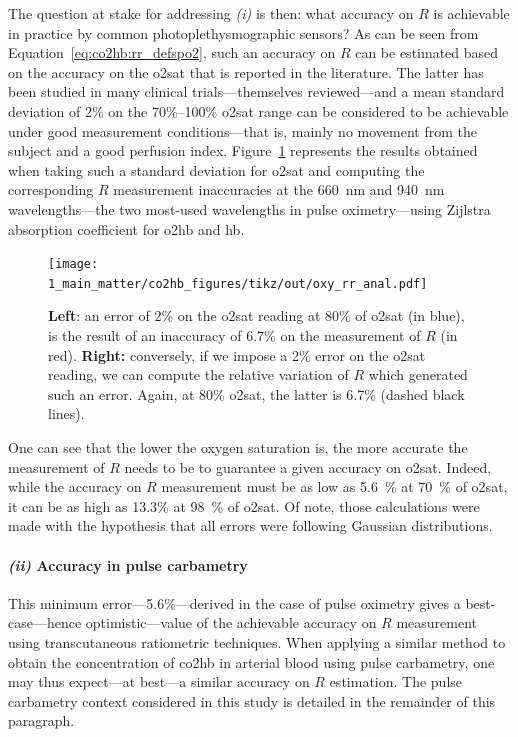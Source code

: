 The question at stake for addressing \textit{(i)} is then: what accuracy on $R$ is achievable in practice by common photoplethysmographic sensors? As can be seen from Equation~\ref{eq:co2hb:rr_defspo2}, such an accuracy on $R$ can be estimated based on the accuracy on the \gls{o2sat} that is reported in the literature. The latter has been studied in many clinical trials---themselves reviewed\cite{nitzan2014, jubran2015}---and a mean standard deviation of 2\% on the 70\%--100\% \gls{o2sat} range can be considered to be achievable under good measurement conditions---that is, mainly no movement from the subject and a good perfusion index. Figure~\ref{fig:oxy_acc} represents the results obtained when taking such a standard deviation for \gls{o2sat} and computing the corresponding $R$ measurement inaccuracies at the 660~nm and 940~nm wavelengths---the two most-used wavelengths in pulse oximetry---using Zijlstra \etal{}\cite{zijlstra2000} absorption coefficient for \gls{o2hb} and \gls{hb}.

\begin{figure}
	\centering
	\texttt{[image: 1\_main\_matter/co2hb\_figures/tikz/out/oxy\_rr\_anal.pdf]}
	\caption[Pulse oximetry ratio of ratios error]{\textbf{Left}: an error of 2\% on the \gls{o2sat} reading at 80\% of \gls{o2sat} (in blue), is the result of an inaccuracy of 6.7\% on the measurement of $R$ (in red). \textbf{Right:} conversely, if we impose a 2\% error on the \gls{o2sat} reading, we can compute the relative variation of $R$ which generated such an error. Again, at 80\% \gls{o2sat}, the latter is 6.7\% (dashed black lines).}
	\label{fig:oxy_acc}
\end{figure}

One can see that the lower the oxygen saturation is, the more accurate the measurement of $R$ needs to be to guarantee a given accuracy on \gls{o2sat}. Indeed, while the accuracy on $R$ measurement must be as low as 5.6~\% at 70~\% of \gls{o2sat}, it can be as high as 13.3\% at 98~\% of \gls{o2sat}. Of note, those calculations were made with the hypothesis that all errors were following Gaussian distributions.

\paragraph*{\textit{(ii)} Accuracy in pulse carbametry}

This minimum error---5.6\%---derived in the case of pulse oximetry gives a best-case---hence optimistic---value of the achievable accuracy on $R$ measurement using transcutaneous ratiometric techniques. When applying a similar method to obtain the concentration of \gls{co2hb} in arterial blood using pulse carbametry, one may thus expect---at best---a similar accuracy on $R$ estimation. The pulse carbametry context considered in this study is detailed in the remainder of this paragraph.

